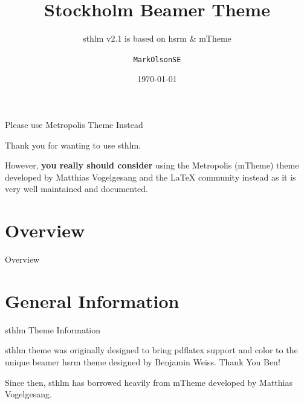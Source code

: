 \documentclass[newPxFont,numfooter,sectionpages]{beamer}
\title{Stockholm Beamer Theme}
\subtitle{sthlm v2.1 is based on hsrm \& mTheme}
\date{\today}
\author{\texttt{MarkOlsonSE}}
\institute{Made in \textit{Sweden} \par \small{File: \jobname}}
\begin{document}
%
%

\maketitle

\begingroup
{}
\begin{frame}{Please use Metropolis Theme Instead}

Thank you for wanting to use sthlm.

\vspace{1em}

However, \textbf{you really should consider} using the Metropolis (mTheme) theme developed by Matthias Vogelgesang and the LaTeX community instead as it is very well maintained and documented.

\begin{center}
\end{center}
\end{frame}
\endgroup


%
%

\section*{Overview}
\begin{frame}{Overview}
\tableofcontents[hideallsubsections]
\end{frame}

%
%

\section{General Information}


\begin{frame}[c]{sthlm Theme Information}

\alert{sthlm} theme was originally designed to bring pdflatex support and color to the unique beamer \alert{hsrm} theme designed by Benjamin Weiss.  Thank You Ben!   

\begin{center}
\end{center}

Since then, \alert{sthlm} has borrowed heavily from \alert{mTheme} developed by Matthias Vogelgesang.  

\end{frame}
\end{document}
